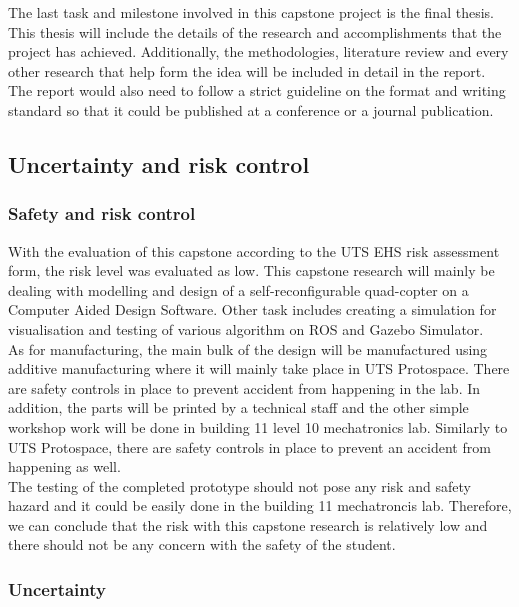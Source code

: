 \documentclass[12pt,A4]{article}
\begin{document}
	The last task and milestone involved in this capstone project is the final thesis. This thesis will include the details of the research and accomplishments that the project has achieved. Additionally, the methodologies, literature review and every other research that help form the idea will be included in detail in the report. The report would also need to follow a strict guideline on the format and writing standard so that it could be published at a conference or a journal publication.\\
	
	\subsection{Uncertainty and risk control}
	
	\subsubsection{Safety and risk control}
	
	With the evaluation of this capstone according to the UTS EHS risk assessment form, the risk level was evaluated as low. This capstone research will mainly be dealing with modelling and design of a self-reconfigurable quad-copter on a Computer Aided Design Software. Other task includes creating a simulation for visualisation and testing of various algorithm on ROS and Gazebo Simulator.\\
	
	As for manufacturing, the main bulk of the design will be manufactured using additive manufacturing where it will mainly take place in UTS Protospace. There are safety controls in place to prevent accident from happening in the lab. In addition, the parts will be printed by a technical staff and the other simple workshop work will be done in building 11 level 10 mechatronics lab. Similarly to UTS Protospace, there are safety controls in place to prevent an accident from happening as well.\\
	
	The testing of the completed prototype should not pose any risk and safety hazard and it could be easily done in the building 11 mechatroncis lab. Therefore, we can conclude that the risk with this capstone research is relatively low and there should not be any concern with the safety of the student.
	
	\subsubsection{Uncertainty}
	
\end{document}
